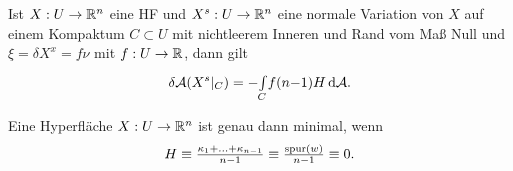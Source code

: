 \documentclass{cheat-sheet}
\newcommand{\A}{\mathcal{A}} %
\begin{document}
\begin{satz}
  Ist $X : U \to \mathbb{R}^n$ eine HF und $X^s : U \to \mathbb{R}^n$ eine normale Variation von $X$ auf einem Kompaktum $C \subset U$ mit nichtleerem Inneren und Rand vom Maß Null und $\xi = \delta X^x = f \nu$ mit $f : U \to \mathbb{R}$, dann gilt
  \[ \delta \A(X^s|_C) = - \Int{C}{}{f (n{-}1) H}{\A}. \]
\end{satz}

\begin{satz}
  Eine Hyperfläche $X : U \to \mathbb{R}^n$ ist genau dann minimal, wenn
  \[ H \equiv \tfrac{\kappa_1 + ... + \kappa_{n{-}1}}{n-1} \equiv \tfrac{\mathrm{spur}(w)}{n-1} \equiv 0. \]
\end{satz}


\end{document}
